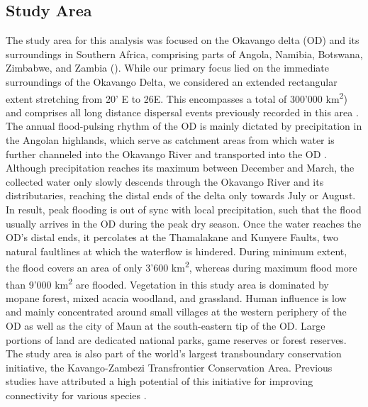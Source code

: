 \documentclass[abstract=on,10pt,a4paper,bibliography=totocnumbered]{article}
\begin{document}
\subsection{Study Area}
The study area for this analysis was focused on the Okavango delta (OD) and its
surroundings in Southern Africa, comprising parts of Angola, Namibia, Botswana,
Zimbabwe, and Zambia (). While our primary focus lied on the
immediate surroundings of the Okavango Delta, we considered an extended
rectangular extent stretching from 20' E to 26\degree E. This
encompasses a total of 300'000 km\textsuperscript{2}) and comprises all long
distance dispersal events previously recorded in this area \citep{Cozzi.2020,
 Hofmann.2021}. The annual flood-pulsing rhythm of the OD is mainly dictated by
precipitation in the Angolan highlands, which serve as catchment areas from
which water is further channeled into the Okavango River and transported into
the OD \citep{Wolski.2017}. Although precipitation reaches its maximum between
December and March, the collected water only slowly descends through the
Okavango River and its distributaries, reaching the distal ends of the delta
only towards July or August. In result, peak flooding is out of sync with local
precipitation, such that the flood usually arrives in the OD during the peak dry
season. Once the water reaches the OD's distal ends, it percolates at the
Thamalakane and Kunyere Faults, two natural faultlines at which the waterflow is
hindered. During minimum extent, the flood covers an area of only 3'600
km\textsuperscript{2}, whereas during maximum flood more than 9'000
km\textsuperscript{2} are flooded. Vegetation in this study area is dominated by
mopane forest, mixed acacia woodland, and grassland. Human influence is low and
mainly concentrated around small villages at the western periphery of the OD as
well as the city of Maun at the south-eastern tip of the OD. Large portions of
land are dedicated national parks, game reserves or forest reserves. The study
area is also part of the world's largest transboundary conservation initiative,
the Kavango-Zambezi Transfrontier Conservation Area. Previous studies have
attributed a high potential of this initiative for improving connectivity for
various species \citep{Brennan.2020, Lines.2021, Hofmann.2021}.
\end{document}
